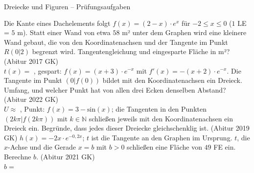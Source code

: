 \begin{aufgabe}{Dreiecke und Figuren – Prüfungsaufgaben}
\begin{teile}
\teil Die Kante eines Dachelements folgt $f(x) = (2 - x) \cdot e^x$ für $-2 \le x \le 0$ ($1$ LE = $5$ m). Statt einer Wand von etwa $58$ m² unter dem Graphen wird eine kleinere Wand gebaut, die von den Koordinatenachsen und der Tangente im Punkt $R(0 | 2)$ begrenzt wird. Tangentengleichung und eingesparte Fläche in m²? \hfill (Abitur 2017 GK) \\ $t(x) =$ \leerfeld , gespart: \leerfeld[m²]
\teil $f(x) = (x + 3) \cdot e^{-x}$ mit $f'(x) = -(x + 2) \cdot e^{-x}$. Die Tangente im Punkt $(0 | f(0))$ bildet mit den Koordinatenachsen ein Dreieck. Umfang, und welcher Punkt hat von allen drei Ecken denselben Abstand? \hfill (Abitur 2022 GK) \\ $U \approx$ \leerfeld , Punkt: \leerfeld
\teil $f(x) = 3 - \mathrm{sin}(x)$; die Tangenten in den Punkten $(2k\pi | f(2k\pi))$ mit $k \in \mathbb{N}$ schließen jeweils mit den Koordinatenachsen ein Dreieck ein. Begründe, dass jedes dieser Dreiecke gleichschenklig ist. \hfill (Abitur 2019 GK)
\teil $h(x) = -2x \cdot e^{-0{,}2x}$; $t$ ist die Tangente an den Graphen im Ursprung. $t$, die $x$-Achse und die Gerade $x = b$ mit $b > 0$ schließen eine Fläche von $49$ FE ein. Berechne $b$. \hfill (Abitur 2021 GK) \\ $b =$ \leerfeld
\end{teile}
\end{aufgabe}
